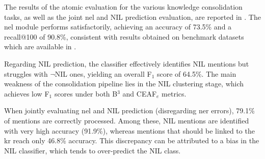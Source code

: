 
The results of the atomic evaluation for the various knowledge consolidation tasks, as well as the joint \ac{nel} and NIL prediction evaluation, are reported in . The \ac{nel} module performs satisfactorily, achieving an accuracy of 73.5\% and a recall@100 of 90.8\%, consistent with results obtained on benchmark datasets which are available in .

Regarding NIL prediction, the classifier effectively identifies NIL mentions but struggles with $\neg$NIL ones, yielding an overall F$_1$ score of 64.5\%. The main weakness of the consolidation pipeline lies in the NIL clustering stage, which achieves low F$_1$ scores under both B$^3$ and CEAF$_e$ metrics.

When jointly evaluating \ac{nel} and NIL prediction (disregarding \ac{ner} errors), 79.1\% of mentions are correctly processed. Among these, NIL mentions are identified with very high accuracy (91.9\%), whereas mentions that should be linked to the \ac{kr} reach only 46.8\% accuracy. This discrepancy can be attributed to a bias in the NIL classifier, which tends to over-predict the NIL class.


